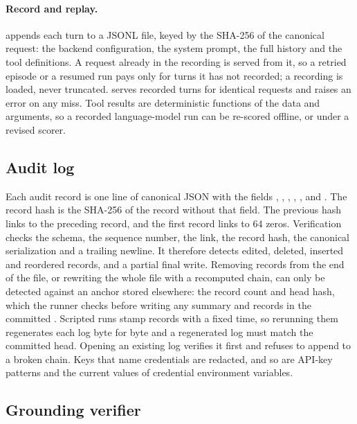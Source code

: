 \paragraph{Record and replay.}
 appends each turn to a JSONL file, keyed by the
SHA-256 of the canonical request: the backend configuration, the system
prompt, the full history and the tool definitions. A request already in the
recording is served from it, so a retried episode or a resumed run pays only
for turns it has not recorded; a recording is loaded, never truncated.
 serves recorded turns for identical requests and raises
an error on any miss. Tool results are deterministic functions of the data and
arguments, so a recorded language-model run can be re-scored offline, or under
a revised scorer.

\subsection{Audit log}
\label{sec:audit}

Each audit record is one line of canonical JSON with the fields ,
, , , , 
and . The record hash is the SHA-256 of the record without
that field. The previous hash links to the preceding record, and the first
record links to 64 zeros. Verification checks the schema, the sequence
number, the link, the record hash, the canonical serialization and a trailing
newline. It therefore detects edited, deleted, inserted and reordered records,
and a partial final write. Removing records from the end of the file, or
rewriting the whole file with a recomputed chain, can only be detected against
an anchor stored elsewhere: the record count and head hash, which the runner
checks before writing any summary and records in the committed
. Scripted runs stamp records with a fixed time, so
rerunning them regenerates each log byte for byte and a regenerated log must
match the committed head. Opening an existing log verifies it first and
refuses to append to a broken chain. Keys that name
credentials are redacted, and so are API-key patterns and the current values
of credential environment variables.

\subsection{Grounding verifier}
\label{sec:grounding}

